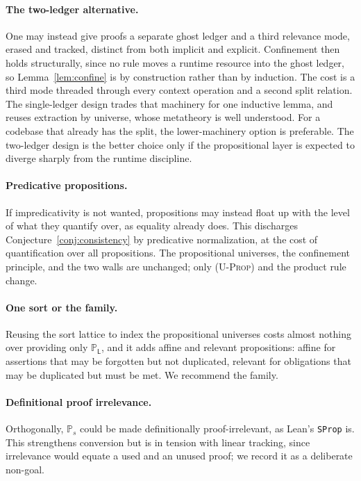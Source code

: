 \documentclass[11pt]{article}
\newcommand{\Prop}[1]{\mathbb{P}_{#1}}            %
\theoremstyle{definition}
\theoremstyle{plain}
\begin{document}
\paragraph{The two-ledger alternative.}
One may instead give proofs a separate ghost ledger and a third relevance mode,
erased and tracked, distinct from both implicit and explicit. Confinement then
holds structurally, since no rule moves a runtime resource into the ghost ledger,
so Lemma~\ref{lem:confine} is by construction rather than by induction. The cost is
a third mode threaded through every context operation and a second split relation.
The single-ledger design trades that machinery for one inductive lemma, and reuses
extraction by universe, whose metatheory is well understood. For a codebase that
already has the split, the lower-machinery option is preferable. The two-ledger
design is the better choice only if the propositional layer is expected to diverge
sharply from the runtime discipline.

\paragraph{Predicative propositions.}
If impredicativity is not wanted, propositions may instead float up with the level
of what they quantify over, as equality already does. This discharges
Conjecture~\ref{conj:consistency} by predicative normalization, at the cost of
quantification over all propositions. The propositional universes, the confinement
principle, and the two walls are unchanged; only \textsc{(U-Prop)} and the product
rule change.

\paragraph{One sort or the family.}
Reusing the sort lattice to index the propositional universes costs almost nothing
over providing only $\Prop{\mathsf{L}}$, and it adds affine and relevant
propositions: affine for assertions that may be forgotten but not duplicated,
relevant for obligations that may be duplicated but must be met. We recommend the
family.

\paragraph{Definitional proof irrelevance.}
Orthogonally, $\Prop{s}$ could be made definitionally proof-irrelevant, as Lean's
\texttt{SProp} is. This strengthens conversion but is in tension with linear
tracking, since irrelevance would equate a used and an unused proof; we record it
as a deliberate non-goal.
\end{document}
